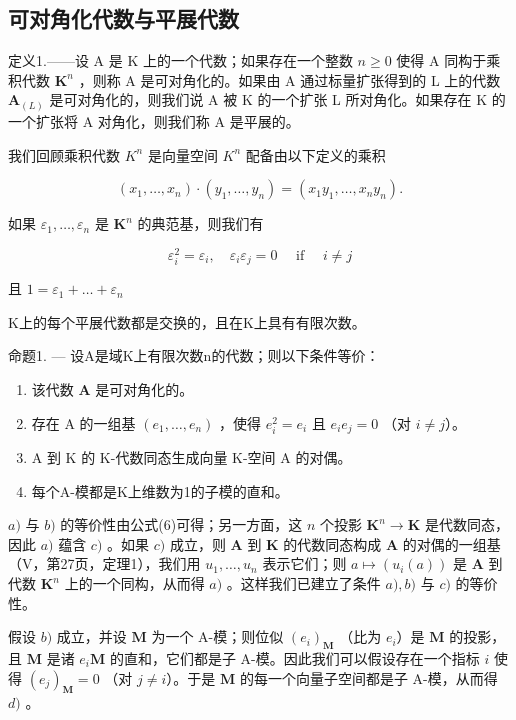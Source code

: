 \subsection{可对角化代数与平展代数}

定义1.——设 A 是 K 上的一个代数；如果存在一个整数 \(n \geqslant 0\) 使得 A 同构于乘积代数 \(\mathbf{K}^n\) ，则称 A 是可对角化的。如果由 A 通过标量扩张得到的 L 上的代数 \(\mathbf{A}_{(L)}\) 是可对角化的，则我们说 A 被 K 的一个扩张 L 所对角化。如果存在 K 的一个扩张将 A 对角化，则我们称 A 是平展的。

我们回顾乘积代数 \(K^{n}\) 是向量空间 \(K^{n}\) 配备由以下定义的乘积

\[
\left(x _ {1}, \dots , x _ {n}\right) \cdot \left(y _ {1}, \dots , y _ {n}\right) = \left(x _ {1} y _ {1}, \dots , x _ {n} y _ {n}\right).\tag{5}
\]

如果 \(\varepsilon_1, \ldots, \varepsilon_n\) 是 \(\mathbf{K}^n\) 的典范基，则我们有

\[
\varepsilon_ {i} ^ {2} = \varepsilon_ {i}, \quad \varepsilon_ {i} \varepsilon_ {j} = 0 \quad \text { if } \quad i \neq j\tag{6}
\]

且 \(1 = \varepsilon_{1} + \dots +\varepsilon_{n}\)

K上的每个平展代数都是交换的，且在K上具有有限次数。

命题1. --- 设A是域K上有限次数n的代数；则以下条件等价：

\begin{enumerate}
\def\labelenumi{\alph{enumi})}
\item
  该代数 \(\mathbf{A}\) 是可对角化的。
\item
  存在 A 的一组基 \((e_1, \ldots, e_n)\) ，使得 \(e_i^2 = e_i\) 且 \(e_i e_j = 0\) （对 \(i \neq j\)）。
\item
  A 到 K 的 K-代数同态生成向量 K-空间 A 的对偶。
\item
  每个A-模都是K上维数为1的子模的直和。
\end{enumerate}

\(a)\) 与 \(b)\) 的等价性由公式(6)可得；另一方面，这 \(n\) 个投影 \(\mathbf{K}^n \to \mathbf{K}\) 是代数同态，因此 \(a)\) 蕴含 \(c)\) 。如果 \(c)\) 成立，则 \(\mathbf{A}\) 到 \(\mathbf{K}\) 的代数同态构成 \(\mathbf{A}\) 的对偶的一组基（V，第27页，定理1），我们用 \(u_1, \ldots, u_n\) 表示它们；则 \(a \mapsto (u_i(a))\) 是 \(\mathbf{A}\) 到代数 \(\mathbf{K}^n\) 上的一个同构，从而得 \(a)\) 。这样我们已建立了条件 \(a), b)\) 与 \(c)\) 的等价性。

假设 \(b)\) 成立，并设 \(\mathbf{M}\) 为一个 A-模；则位似 \((e_i)_{\mathbf{M}}\) （比为 \(e_i\)）是 \(\mathbf{M}\) 的投影，且 \(\mathbf{M}\) 是诸 \(e_i\mathbf{M}\) 的直和，它们都是子 A-模。因此我们可以假设存在一个指标 \(i\) 使得 \((e_j)_{\mathbf{M}} = 0\) （对 \(j \neq i\)）。于是 \(\mathbf{M}\) 的每一个向量子空间都是子 A-模，从而得 \(d)\) 。

